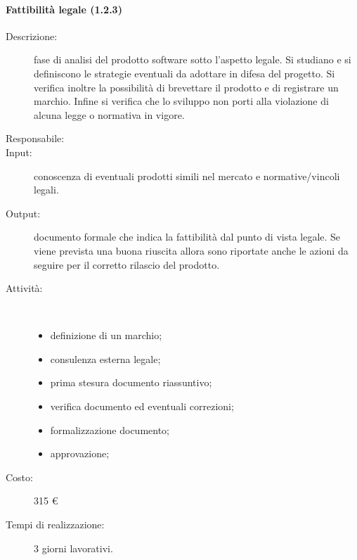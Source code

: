 \begin{description}
\paragraph{Fattibilit\`{a} legale (1.2.3)}
\begin{description}
\item[Descrizione:] fase di analisi del prodotto software sotto l'aspetto legale. Si studiano e si definiscono le strategie eventuali da adottare in difesa del progetto. Si verifica inoltre la possibilit\`{a} di brevettare il prodotto e di registrare un marchio. Infine si verifica che lo sviluppo non porti alla violazione di alcuna legge o normativa in vigore.
\item[Responsabile:]
\item[Input:] conoscenza di eventuali prodotti simili nel mercato e normative/vincoli legali.
\item[Output:] documento formale che indica la fattibilità dal punto di vista legale. Se viene prevista una buona riuscita allora sono riportate anche le azioni da seguire per il corretto rilascio del prodotto.
\item[Attività:]\mbox{}\\[-1.5\baselineskip]
	\begin{itemize}
	\item definizione di un marchio;
	\item consulenza esterna legale;
	\item prima stesura documento riassuntivo;
	\item verifica documento ed eventuali correzioni;
	\item formalizzazione documento;
	\item approvazione;
	\end{itemize}

\item[Costo:] 315 \euro{}
\item[Tempi di realizzazione:] 3 giorni lavorativi.
\end{description}

\end{description}
